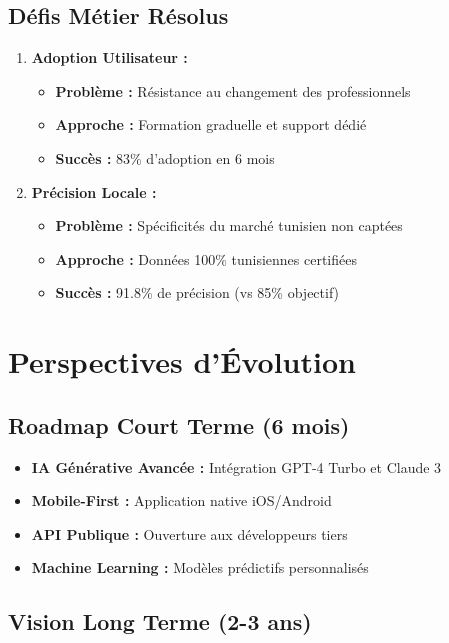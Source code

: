 \subsection{Défis Métier Résolus}

\begin{enumerate}
    \item \textbf{Adoption Utilisateur :}
    \begin{itemize}
        \item \textbf{Problème :} Résistance au changement des professionnels
        \item \textbf{Approche :} Formation graduelle et support dédié
        \item \textbf{Succès :} 83\% d'adoption en 6 mois
    \end{itemize}
    
    \item \textbf{Précision Locale :}
    \begin{itemize}
        \item \textbf{Problème :} Spécificités du marché tunisien non captées
        \item \textbf{Approche :} Données 100\% tunisiennes certifiées
        \item \textbf{Succès :} 91.8\% de précision (vs 85\% objectif)
    \end{itemize}
\end{enumerate}

\section{Perspectives d'Évolution}

\subsection{Roadmap Court Terme (6 mois)}

\begin{itemize}
    \item \textbf{IA Générative Avancée :} Intégration GPT-4 Turbo et Claude 3
    \item \textbf{Mobile-First :} Application native iOS/Android
    \item \textbf{API Publique :} Ouverture aux développeurs tiers
    \item \textbf{Machine Learning :} Modèles prédictifs personnalisés
\end{itemize}

\subsection{Vision Long Terme (2-3 ans)}

